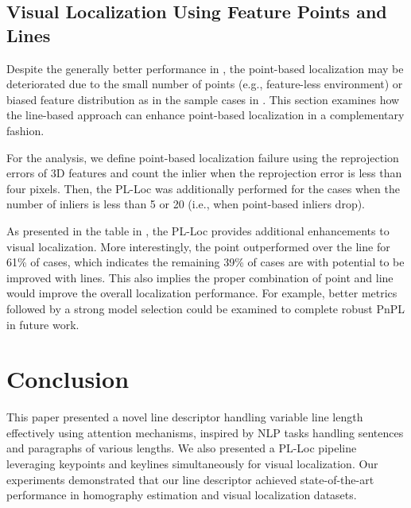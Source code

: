 \documentclass[letterpaper, 10 pt, journal, twoside]{ieeetran}
\begin{document}
\subsection{Visual Localization Using Feature Points and Lines}
\label{sec:pl-loc}

Despite the generally better performance in , the point-based localization may be deteriorated due to the small number of points (e.g., feature-less environment) or biased feature distribution as in the sample cases in . This section examines how the line-based approach can enhance point-based localization in a complementary fashion.

For the analysis, we define point-based localization failure using the reprojection errors of 3D features and count the inlier when the reprojection error is less than four pixels. Then, the \ac{PL-Loc} was additionally performed for the cases when the number of inliers is less than 5 or 20 (i.e., when point-based inliers drop).

As presented in the table in , the \ac{PL-Loc} provides additional enhancements to visual localization. More interestingly, the point outperformed over the line for 61\% of cases, which indicates the remaining 39\% of cases are with potential to be improved with lines. This also implies the proper combination of point and line would improve the overall localization performance. For example, better metrics followed by a strong model selection could be examined to complete robust PnPL in future work.




\section{Conclusion}
\label{sec:conclusion}

This paper presented a novel line descriptor handling variable line length effectively using attention mechanisms, inspired by \ac{NLP} tasks handling sentences and paragraphs of various lengths. We also presented a \ac{PL-Loc} pipeline leveraging keypoints and keylines simultaneously for visual localization. Our experiments demonstrated that our line descriptor achieved state-of-the-art performance in homography estimation and visual localization datasets.




\small


\end{document}
